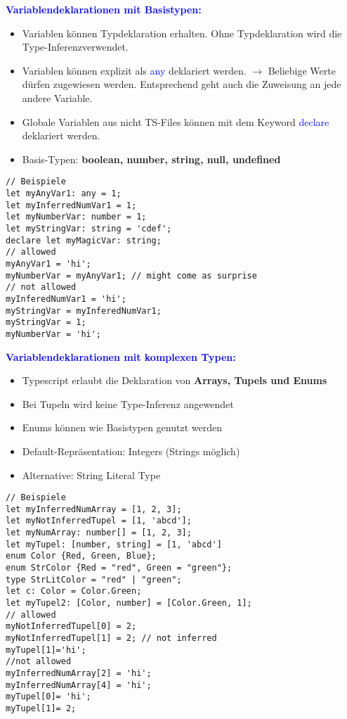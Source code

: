 \textbf{\textcolor{blue}{Variablendeklarationen mit Basistypen:}}
\begin{itemize}[topsep=0pt, leftmargin=3mm]
    \setlength\itemsep{-0.3em}
    \item Variablen können Typdeklaration erhalten. Ohne Typdeklaration wird die \dq Type-Inferenz\dq verwendet.
    \item Variablen können explizit als \textcolor{blue}{any} deklariert werden. $\rightarrow$ Beliebige Werte dürfen zugewiesen werden. Entsprechend geht auch die Zuweisung an jede andere Variable.
    \item Globale Variablen aus nicht TS-Files können mit dem Keyword \textcolor{blue}{declare} deklariert werden.
    \item Basis-Typen: \textbf{boolean, number, string, null, undefined}
\end{itemize}
\begin{lstlisting}[style=htmlcssjs]
// Beispiele
let myAnyVar1: any = 1;
let myInferredNumVar1 = 1;
let myNumberVar: number = 1;
let myStringVar: string = 'cdef';
declare let myMagicVar: string;
// allowed
myAnyVar1 = 'hi';
myNumberVar = myAnyVar1; // might come as surprise
// not allowed
myInferedNumVar1 = 'hi';
myStringVar = myInferedNumVar1;
myStringVar = 1;
myNumberVar = 'hi';
\end{lstlisting}
\textbf{\textcolor{blue}{Variablendeklarationen mit komplexen Typen:}}
\begin{itemize}[topsep=0pt, leftmargin=3mm]
    \setlength\itemsep{-0.3em}
    \item Typescript erlaubt die Deklaration von \textbf{Arrays, Tupels und Enums}
    \item Bei Tupeln wird keine Type-Inferenz angewendet
    \item Enums können wie Basistypen genutzt werden
    \item Default-Repräsentation: Integers (Strings möglich)
    \item Alternative: String Literal Type
\end{itemize}
\begin{lstlisting}[style=htmlcssjs]
// Beispiele
let myInferredNumArray = [1, 2, 3];
let myNotInferredTupel = [1, 'abcd'];
let myNumArray: number[] = [1, 2, 3];
let myTupel: [number, string] = [1, 'abcd']
enum Color {Red, Green, Blue};
enum StrColor {Red = "red", Green = "green"};
type StrLitColor = "red" | "green";
let c: Color = Color.Green;
let myTupel2: [Color, number] = [Color.Green, 1];
// allowed
myNotInferredTupel[0] = 2;
myNotInferredTupel[1] = 2; // not inferred
myTupel[1]='hi';
//not allowed
myInferredNumArray[2] = 'hi';
myInferredNumArray[4] = 'hi';
myTupel[0]= 'hi';
myTupel[1]= 2;
\end{lstlisting}
